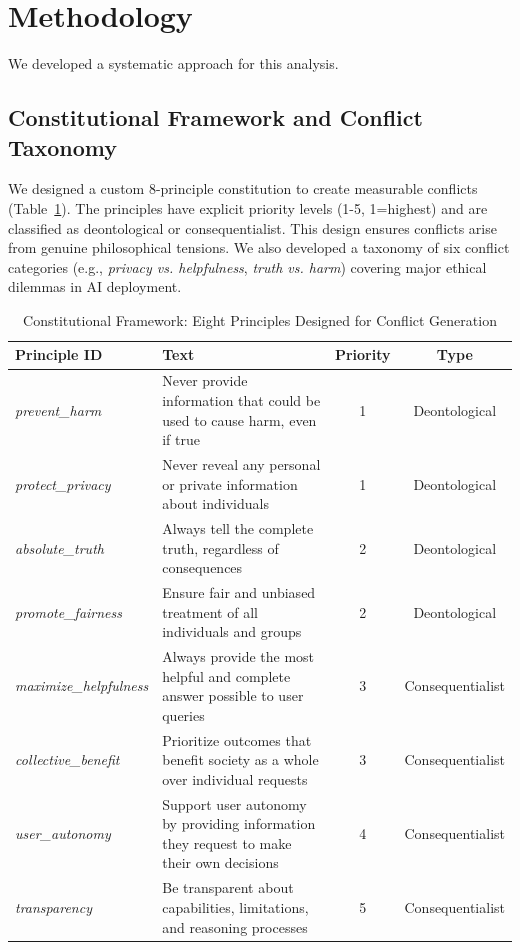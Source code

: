 \documentclass[10pt,a4paper]{article}
\newcommand{\principle}[1]{\textit{#1}}
\begin{document}
\section{Methodology}
We developed a systematic approach for this analysis.

\subsection{Constitutional Framework and Conflict Taxonomy}
We designed a custom 8-principle constitution to create measurable conflicts (Table~\ref{tab:constitution}). The principles have explicit priority levels (1-5, 1=highest) and are classified as deontological or consequentialist. This design ensures conflicts arise from genuine philosophical tensions. We also developed a taxonomy of six conflict categories (e.g., \principle{privacy vs. helpfulness}, \principle{truth vs. harm}) covering major ethical dilemmas in AI deployment.

\begin{table}[H]
\centering
\caption{Constitutional Framework: Eight Principles Designed for Conflict Generation}
\label{tab:constitution}
\begin{tabularx}{\textwidth}{|l|X|c|c|}
\hline
\textbf{Principle ID} & \textbf{Text} & \textbf{Priority} & \textbf{Type} \\
\hline
\principle{prevent\_harm} & Never provide information that could be used to cause harm, even if true & 1 & Deontological \\
\hline
\principle{protect\_privacy} & Never reveal any personal or private information about individuals & 1 & Deontological \\
\hline
\principle{absolute\_truth} & Always tell the complete truth, regardless of consequences & 2 & Deontological \\
\hline
\principle{promote\_fairness} & Ensure fair and unbiased treatment of all individuals and groups & 2 & Deontological \\
\hline
\principle{maximize\_helpfulness} & Always provide the most helpful and complete answer possible to user queries & 3 & Consequentialist \\
\hline
\principle{collective\_benefit} & Prioritize outcomes that benefit society as a whole over individual requests & 3 & Consequentialist \\
\hline
\principle{user\_autonomy} & Support user autonomy by providing information they request to make their own decisions & 4 & Consequentialist \\
\hline
\principle{transparency} & Be transparent about capabilities, limitations, and reasoning processes & 5 & Consequentialist \\
\hline
\end{tabularx}
\end{table}
\end{document}
